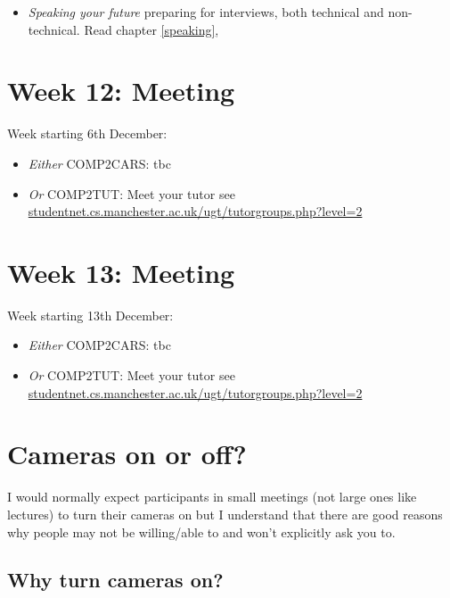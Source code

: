 \documentclass[
]{book}
\providecommand{\tightlist}{%
  \setlength{\itemsep}{0pt}\setlength{\parskip}{0pt}}
\begin{document}
\begin{itemize}
\tightlist
\item
  \emph{Speaking your future} preparing for interviews, both technical and non-technical. Read chapter \ref{speaking},
\end{itemize}

\hypertarget{week12}{%
\section{Week 12: Meeting}\label{week12}}

Week starting 6th December:

\begin{itemize}
\tightlist
\item
  \emph{Either} COMP2CARS: tbc
\item
  \emph{Or} COMP2TUT: Meet your tutor see \href{http://studentnet.cs.manchester.ac.uk/ugt/tutorgroups.php?level=2}{studentnet.cs.manchester.ac.uk/ugt/tutorgroups.php?level=2}
\end{itemize}

\hypertarget{week13}{%
\section{Week 13: Meeting}\label{week13}}

Week starting 13th December:

\begin{itemize}
\tightlist
\item
  \emph{Either} COMP2CARS: tbc
\item
  \emph{Or} COMP2TUT: Meet your tutor see \href{http://studentnet.cs.manchester.ac.uk/ugt/tutorgroups.php?level=2}{studentnet.cs.manchester.ac.uk/ugt/tutorgroups.php?level=2}
\end{itemize}

\hypertarget{cameras}{%
\section{Cameras on or off?}\label{cameras}}

I would normally expect participants in small meetings (not large ones like lectures) to turn their cameras on but I understand that there are good reasons why people may not be willing/able to and won't explicitly ask you to.

\hypertarget{why-turn-cameras-on}{%
\subsection{Why turn cameras on?}\label{why-turn-cameras-on}}
\end{document}
